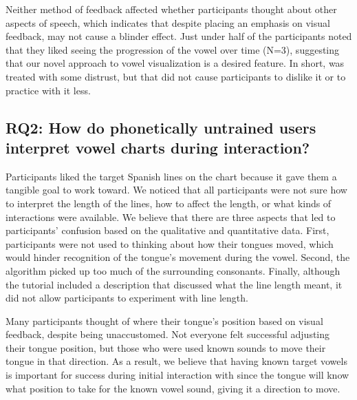 Neither method of feedback affected whether participants thought about other aspects of speech, which indicates that despite placing an emphasis on visual feedback, \visowel{} may not cause a blinder effect. Just under half of the participants noted that they liked seeing the progression of the vowel over time (N=3), suggesting that our novel approach to vowel visualization is a desired feature. In short, \visowel{} was treated with some distrust, but that did not cause participants to dislike it or to practice with it less. 

\subsection{RQ2: How do phonetically untrained users interpret vowel charts during interaction?}
Participants liked the target Spanish lines on the chart because it gave them a tangible goal to work toward. We noticed that all participants were not sure how to interpret the length of the lines, how to affect the length, or what kinds of interactions were available. We believe that there are three aspects that led to participants' confusion based on the qualitative and quantitative data. First, participants were not used to thinking about how their tongues moved, which would hinder recognition of the tongue's movement during the vowel. Second, the algorithm picked up too much of the surrounding consonants. Finally, although the \visowel{} tutorial included a description that discussed what the line length meant, it did not allow participants to experiment with line length.

Many participants thought of where their tongue's position based on visual feedback, despite being unaccustomed. Not everyone felt successful adjusting their tongue position, but those who were used known sounds to move their tongue in that direction. As a result, we believe that having known target vowels is important for success during initial interaction with \visowel{} since the tongue will know what position to take for the known vowel sound, giving it a direction to move. 

